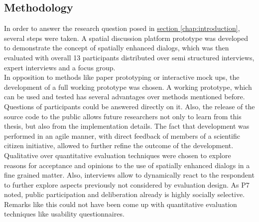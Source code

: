 \subsection{Methodology}
\label{sub:method-discussion}
In order to answer the research question posed in \hyperref[chap:introduction]{section \ref{chap:introduction}}, several steps were taken. A spatial discussion platform prototype was developed to demonstrate the concept of spatially enhanced dialogs, which was then evaluated with overall 13 participants distributed over semi structured interviews, expert interviews and a focus group.\\
In opposition to methods like paper prototyping or interactive mock ups, the development of a full working prototype was chosen. A working prototype, which can be used and tested has several advantages over methods mentioned before. Questions of participants could be answered directly on it. Also, the release of the source code to the public allows future researchers not only to learn from this thesis, but also from the implementation details. The fact that development was performed in an agile manner, with direct feedback of members of a scientific citizen initiative, allowed to further refine the outcome of the development.\\
Qualitative over quantitative evaluation techniques were chosen to explore reasons for acceptance and opinions to the use of spatially enhanced dialogs in a fine grained matter. Also, interviews allow to dynamically react to the respondent to further explore aspects previously not considered by evaluation design. As P7 noted, public participation and deliberation already is highly socially selective. Remarks like this could not have been come up with quantitative evaluation techniques like usability questionnaires.\\

